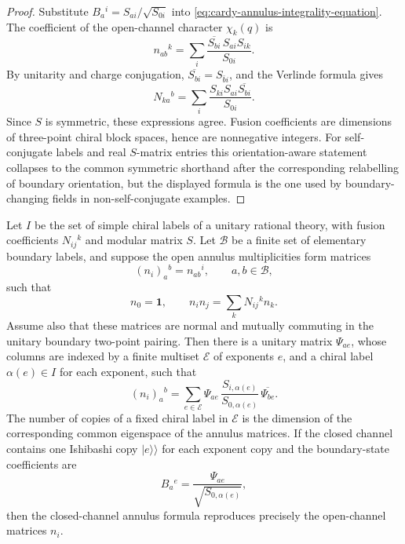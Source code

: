 \begin{proof}
Substitute \(B_a{}^i=S_{ai}/\sqrt{S_{0i}}\) into
\eqref{eq:cardy-annulus-integrality-equation}.  The coefficient of the
open-channel character \(\chi_k(q)\) is
\[
  n_{ab}{}^k
  =
  \sum_i
  \frac{\overline{S_{bi}}\,S_{ai}S_{ik}}{S_{0i}} .
\]
By unitarity and charge conjugation, \(\overline{S_{bi}}=S_{\bar b i}\), and
the Verlinde formula gives
\[
  N_{ka}{}^b
  =
  \sum_i
  \frac{S_{ki}S_{ai}\overline{S_{bi}}}{S_{0i}} .
\]
Since \(S\) is symmetric, these expressions agree.  Fusion coefficients are
dimensions of three-point chiral block spaces, hence are nonnegative
integers.  For self-conjugate labels and real \(S\)-matrix entries this
orientation-aware statement collapses to the common symmetric shorthand after
the corresponding relabelling of boundary orientation, but the displayed
formula is the one used by boundary-changing fields in non-self-conjugate
examples.
\end{proof}

\begin{proposition}
\label{prop:bcft-annulus-nimrep-spectral-resolution}
Let \(I\) be the set of simple chiral labels of a unitary rational theory,
with fusion coefficients \(N_{ij}{}^k\) and modular matrix \(S\).  Let
\(\mathcal B\) be a finite set of elementary boundary labels, and suppose the
open annulus multiplicities form matrices
\[
  (n_i)_a{}^b=n_{ab}{}^i,
  \qquad a,b\in\mathcal B,
\]
such that
\begin{equation}
  n_0=\mathbf 1,\qquad
  n_i n_j=\sum_k N_{ij}{}^k n_k .
  \label{eq:bcft-nimrep-ring-representation}
\end{equation}
Assume also that these matrices are normal and mutually commuting in the
unitary boundary two-point pairing.  Then there is a unitary matrix
\(\Psi_{a e}\), whose columns are indexed by a finite multiset
\(\mathcal E\) of exponents \(e\), and a chiral label \(\alpha(e)\in I\) for
each exponent, such that
\begin{equation}
  (n_i)_a{}^b
  =
  \sum_{e\in\mathcal E}
  \Psi_{a e}\,
  \frac{S_{i,\alpha(e)}}{S_{0,\alpha(e)}}\,
  \overline{\Psi_{b e}} .
  \label{eq:bcft-annulus-nimrep-spectral-resolution}
\end{equation}
The number of copies of a fixed chiral label in \(\mathcal E\) is the
dimension of the corresponding common eigenspace of the annulus matrices.
If the closed channel contains one Ishibashi copy \(|e\rangle\!\rangle\) for
each exponent copy and the boundary-state coefficients are
\begin{equation}
  B_a{}^e
  =
  \frac{\Psi_{a e}}{\sqrt{S_{0,\alpha(e)}}},
  \label{eq:bcft-nimrep-boundary-reflection-coefficients}
\end{equation}
then the closed-channel annulus formula reproduces precisely the open-channel
matrices \(n_i\).
\end{proposition}

